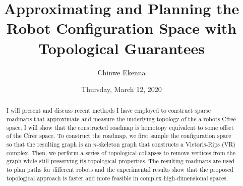 \documentclass{UAmathtalk}
\author{Chinwe Ekenna}
\title{Approximating and Planning the Robot Configuration Space with Topological Guarantees}
\date{Thursday, March 12, 2020}
\begin{document}
\maketitle

\begin{abstract}
I will present and discuss recent methods I have employed to construct sparse roadmaps that approximate and measure the underlying topology of the a robots Cfree space. I will show that the constructed roadmap is homotopy equivalent to some offset of the Cfree space. To construct the roadmap, we first sample the configuration space so that the resulting graph is an $n$-skeleton graph that constructs a Vietoris-Rips (VR) complex. Then, we perform a series of topological collapses to remove vertices from the graph while still preserving its topological properties. The resulting roadmaps are used to plan paths for different robots and the experimental results show that the proposed topological approach is faster and more feasible in complex high-dimensional spaces.
\end{abstract}
\end{document}
